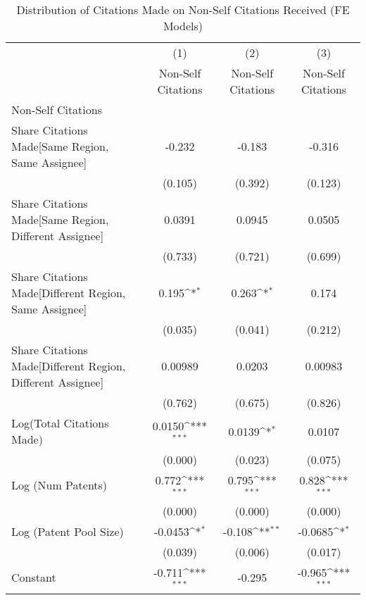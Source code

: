 {
\def\sym#1{\ifmmode^{#1}\else\(^{#1}\)\fi}
\begin{longtable}{l*{3}{c}}
\caption{Distribution of Citations Made on Non-Self Citations Received (FE Models)  \label{model192021}}\\
\hline\hline\endfirsthead\hline\endhead\hline\endfoot\endlastfoot
                &\multicolumn{1}{c}{(1)}&\multicolumn{1}{c}{(2)}&\multicolumn{1}{c}{(3)}\\
                &\multicolumn{1}{c}{Non-Self Citations}&\multicolumn{1}{c}{Non-Self Citations}&\multicolumn{1}{c}{Non-Self Citations}\\
\hline
Non-Self Citations&                  &                  &                  \\
Share Citations Made[Same Region, Same Assignee]&   -0.232         &   -0.183         &   -0.316         \\
                &  (0.105)         &  (0.392)         &  (0.123)         \\
Share Citations Made[Same Region, Different Assignee]&   0.0391         &   0.0945         &   0.0505         \\
                &  (0.733)         &  (0.721)         &  (0.699)         \\
Share Citations Made[Different Region, Same Assignee]&    0.195\sym{*}  &    0.263\sym{*}  &    0.174         \\
                &  (0.035)         &  (0.041)         &  (0.212)         \\
Share Citations Made[Different Region, Different Assignee]&  0.00989         &   0.0203         &  0.00983         \\
                &  (0.762)         &  (0.675)         &  (0.826)         \\
Log(Total Citations Made)&   0.0150\sym{***}&   0.0139\sym{*}  &   0.0107         \\
                &  (0.000)         &  (0.023)         &  (0.075)         \\
Log (Num Patents)&    0.772\sym{***}&    0.795\sym{***}&    0.828\sym{***}\\
                &  (0.000)         &  (0.000)         &  (0.000)         \\
Log (Patent Pool Size)&  -0.0453\sym{*}  &   -0.108\sym{**} &  -0.0685\sym{*}  \\
                &  (0.039)         &  (0.006)         &  (0.017)         \\
Constant        &   -0.711\sym{***}&   -0.295         &   -0.965\sym{***}\\

\end{longtable}}
